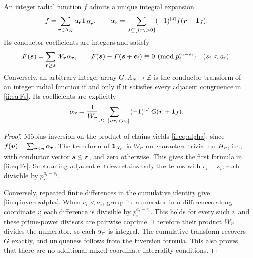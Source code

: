 \begin{lemma}\label{ii:lem:integrality}
An integer radial function $f$ admits a unique integral expansion
\begin{equation}\label{ii:eq:alpha}
 f=\sum_{\boldsymbol{r}\in\Lambda_N}\alpha_{\boldsymbol{r}}\mathbf 1_{H_{\boldsymbol{r}}},\qquad
 \alpha_{\boldsymbol{r}}=\sum_{J\subseteq\{i:r_i>0\}}(-1)^{|J|}f(\boldsymbol{r}-\mathbf 1_J).
\end{equation}
Its conductor coefficients are integers and satisfy
\begin{equation}\label{ii:eq:Fs}
 F(\boldsymbol{s})=\sum_{\boldsymbol{r}\ge\boldsymbol{s}}W_{\boldsymbol{r}}\alpha_{\boldsymbol{r}},
 \qquad
 F(\boldsymbol{s})-F(\boldsymbol{s}+\boldsymbol{e}_i)\equiv0\pmod{p_i^{a_i-s_i}}
 \quad(s_i<a_i).
\end{equation}
Conversely, an arbitrary integer array $G:\Lambda_N\to\mathbb Z$ is the conductor transform of an integer radial function if and only if it satisfies every adjacent congruence in \eqref{ii:eq:Fs}.  Its coefficients are explicitly
\begin{equation}\label{ii:eq:inversealpha}
 \alpha_{\boldsymbol{r}}=\frac{1}{W_{\boldsymbol{r}}}
 \sum_{J\subseteq\{i:r_i<a_i\}}(-1)^{|J|}G(\boldsymbol{r}+\mathbf 1_J).
\end{equation}
\end{lemma}
\begin{proof}
M\"obius inversion on the product of chains yields \eqref{ii:eq:alpha}, since $f(\boldsymbol{v})=\sum_{\boldsymbol{r}\le\boldsymbol{v}}\alpha_{\boldsymbol{r}}$.  The transform of $\mathbf 1_{H_{\boldsymbol{r}}}$ is $W_{\boldsymbol{r}}$ on characters trivial on $H_{\boldsymbol{r}}$, i.e., with conductor vector $\boldsymbol{s}\le\boldsymbol{r}$, and zero otherwise.  This gives the first formula in \eqref{ii:eq:Fs}.  Subtracting adjacent entries retains only the terms with $r_i=s_i$, each divisible by $p_i^{a_i-s_i}$.

Conversely, repeated finite differences in the cumulative identity give \eqref{ii:eq:inversealpha}.  When $r_i<a_i$, group its numerator into differences along coordinate $i$; each difference is divisible by $p_i^{a_i-r_i}$.  This holds for every such $i$, and these prime-power divisors are pairwise coprime.  Therefore their product $W_{\boldsymbol{r}}$ divides the numerator, so each $\alpha_{\boldsymbol{r}}$ is integral.  The cumulative transform recovers $G$ exactly, and uniqueness follows from the inversion formula.  This also proves that there are no additional mixed-coordinate integrality conditions.\qedhere
\end{proof}

